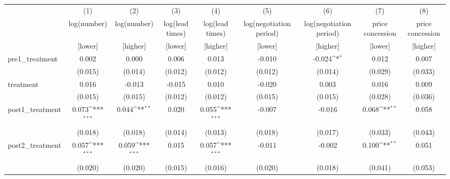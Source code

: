 {
\def\sym#1{\ifmmode^{#1}\else\(^{#1}\)\fi}
\begin{adjustbox}{max width=\textwidth}
\begin{tabular}{l*{8}{c}}
\toprule
            &\multicolumn{1}{c}{(1)}&\multicolumn{1}{c}{(2)}&\multicolumn{1}{c}{(3)}&\multicolumn{1}{c}{(4)}&\multicolumn{1}{c}{(5)}&\multicolumn{1}{c}{(6)}&\multicolumn{1}{c}{(7)}&\multicolumn{1}{c}{(8)}\\
            &\multicolumn{1}{c}{log(number)}&\multicolumn{1}{c}{log(number)}&\multicolumn{1}{c}{log(lead times)}&\multicolumn{1}{c}{log(lead times)}&\multicolumn{1}{c}{log(negotiation period)}&\multicolumn{1}{c}{log(negotiation period)}&\multicolumn{1}{c}{price concession}&\multicolumn{1}{c}{price concession}\\
&[lower]&[higher]&[lower]&[higher]&[lower]&[higher]&[lower]&[higher]\\
\midrule
pre1\_treatment&       0.002         &       0.000         &       0.006         &       0.013         &      -0.010         &      -0.024\sym{*}  &       0.012         &       0.007         \\
            &     (0.015)         &     (0.014)         &     (0.012)         &     (0.012)         &     (0.012)         &     (0.014)         &     (0.029)         &     (0.033)         \\
\addlinespace
treatment   &       0.016         &      -0.013         &      -0.015         &       0.010         &      -0.020         &       0.003         &       0.016         &       0.009         \\
            &     (0.015)         &     (0.015)         &     (0.012)         &     (0.012)         &     (0.015)         &     (0.015)         &     (0.028)         &     (0.036)         \\
\addlinespace
post1\_treatment&       0.073\sym{***}&       0.044\sym{**} &       0.020         &       0.055\sym{***}&      -0.007         &      -0.016         &       0.068\sym{**} &       0.058         \\
            &     (0.018)         &     (0.018)         &     (0.014)         &     (0.013)         &     (0.018)         &     (0.017)         &     (0.033)         &     (0.043)         \\
\addlinespace
post2\_treatment&       0.057\sym{***}&       0.059\sym{***}&       0.015         &       0.057\sym{***}&      -0.011         &      -0.002         &       0.100\sym{**} &       0.051         \\
            &     (0.020)         &     (0.020)         &     (0.015)         &     (0.016)         &     (0.020)         &     (0.018)         &     (0.041)         &     (0.053)         \\

\end{tabular}
\end{adjustbox}}
